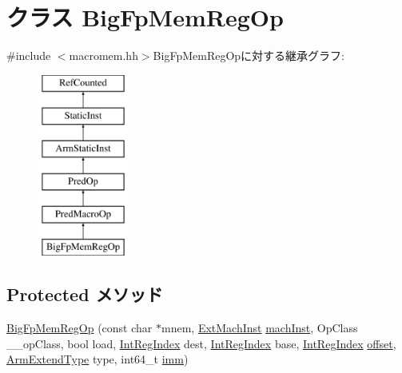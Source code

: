 \hypertarget{classArmISA_1_1BigFpMemRegOp}{
\section{クラス BigFpMemRegOp}
\label{classArmISA_1_1BigFpMemRegOp}
}


{\ttfamily \#include $<$macromem.hh$>$}BigFpMemRegOpに対する継承グラフ:\begin{figure}[H]
\begin{center}
\leavevmode
\includegraphics[height=6cm]{classArmISA_1_1BigFpMemRegOp}
\end{center}
\end{figure}
\subsection*{Protected メソッド}
\begin{DoxyCompactItemize}
\item 
\hyperlink{classArmISA_1_1BigFpMemRegOp_ad1eb7e0d1cbb6a2e6213f92ba6babe90}{BigFpMemRegOp} (const char $\ast$mnem, \hyperlink{classStaticInst_a5605d4fc727eae9e595325c90c0ec108}{ExtMachInst} \hyperlink{classStaticInst_a744598b194ca3d4201d9414ce4cc4af4}{machInst}, OpClass \_\-\_\-opClass, bool load, \hyperlink{namespaceArmISA_ae64680ba9fb526106829d6bf92fc791b}{IntRegIndex} dest, \hyperlink{namespaceArmISA_ae64680ba9fb526106829d6bf92fc791b}{IntRegIndex} base, \hyperlink{namespaceArmISA_ae64680ba9fb526106829d6bf92fc791b}{IntRegIndex} \hyperlink{namespaceArmISA_a87b7a740701cddafb930a9460e9f4eba}{offset}, \hyperlink{namespaceArmISA_a4420842b5673543552a3aba317c69dbb}{ArmExtendType} type, int64\_\-t \hyperlink{namespaceArmISA_a2308526fcc9af84548a72f9ba3102ec1}{imm})
\end{DoxyCompactItemize}


